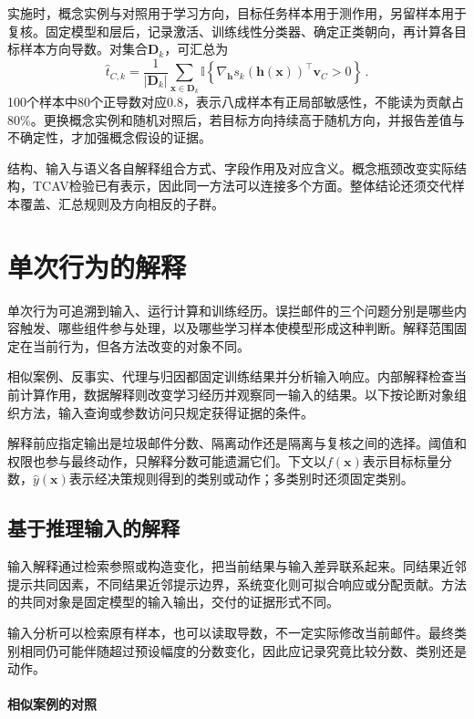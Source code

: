 实施时，概念实例与对照用于学习方向，目标任务样本用于测作用，另留样本用于复核。固定模型和层后，记录激活、训练线性分类器、确定正类朝向，再计算各目标样本方向导数。对集合$\bm D_k$，可汇总为
\[
 \widehat t_{C,k}
 =\frac1{|\bm D_k|}\sum_{\bm{x}\in\bm D_k}
 \mathbb I\!\left\{
 \nabla_{\bm h}s_k(\bm h(\bm{x}))^\top\bm v_C>0
 \right\}\, .
\]
100个样本中80个正导数对应0.8，表示八成样本有正局部敏感性，不能读为贡献占80\%。更换概念实例和随机对照后，若目标方向持续高于随机方向，并报告差值与不确定性，才加强概念假设的证据。

结构、输入与语义各自解释组合方式、字段作用及对应含义。概念瓶颈改变实际结构，TCAV检验已有表示，因此同一方法可以连接多个方面。整体结论还须交代样本覆盖、汇总规则及方向相反的子群。

\section{单次行为的解释}
\label{sec:interpretability-local}

单次行为可追溯到输入、运行计算和训练经历。误拦邮件的三个问题分别是哪些内容触发、哪些组件参与处理，以及哪些学习样本使模型形成这种判断。解释范围固定在当前行为，但各方法改变的对象不同。

相似案例、反事实、代理与归因都固定训练结果并分析输入响应。内部解释检查当前计算作用，数据解释则改变学习经历并观察同一输入的结果。以下按论断对象组织方法，输入查询或参数访问只规定获得证据的条件。

解释前应指定输出是垃圾邮件分数、隔离动作还是隔离与复核之间的选择。阈值和权限也参与最终动作，只解释分数可能遗漏它们。下文以$f(\bm x)$表示目标标量分数，$\hat y(\bm x)$表示经决策规则得到的类别或动作；多类别时还须固定类别。

\subsection{基于推理输入的解释}
\label{sec:interpretability-local-input}

输入解释通过检索参照或构造变化，把当前结果与输入差异联系起来。同结果近邻提示共同因素，不同结果近邻提示边界，系统变化则可拟合响应或分配贡献。方法的共同对象是固定模型的输入输出，交付的证据形式不同。

输入分析可以检索原有样本，也可以读取导数，不一定实际修改当前邮件。最终类别相同仍可能伴随超过预设幅度的分数变化，因此应记录究竟比较分数、类别还是动作。

\paragraph{相似案例的对照}
\label{sec:interpretability-local-examples}

